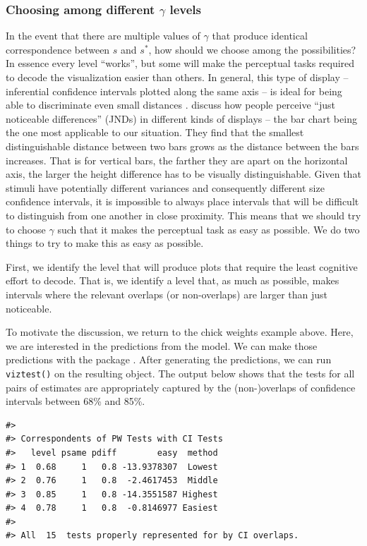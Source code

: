 \subsubsection{\texorpdfstring{Choosing among different \(\gamma\) levels}{Choosing among different \textbackslash gamma levels}}\label{choosing-among-different-gamma-levels}

In the event that there are multiple values of \(\gamma\) that produce identical correspondence between \(s\) and \(s^{*}\), how should we choose among the possibilities? In essence every level ``works'', but some will make the perceptual tasks required to decode the visualization easier than others. In general, this type of display -- inferential confidence intervals plotted along the same axis -- is ideal for being able to discriminate even small distances \citep{cleveland84}. \citet{Lu2022} discuss how people perceive ``just noticeable differences'' (JNDs) in different kinds of displays -- the bar chart being the one most applicable to our situation. They find that the smallest distinguishable distance between two bars grows as the distance between the bars increases. That is for vertical bars, the farther they are apart on the horizontal axis, the larger the height difference has to be visually distinguishable. Given that stimuli have potentially different variances and consequently different size confidence intervals, it is impossible to always place intervals that will be difficult to distinguish from one another in close proximity. This means that we should try to choose \(\gamma\) such that it makes the perceptual task as easy as possible. We do two things to try to make this as easy as possible.

First, we identify the level that will produce plots that require the least cognitive effort to decode. That is, we identify a level that, as much as possible, makes intervals where the relevant overlaps (or non-overlaps) are larger than just noticeable.

To motivate the discussion, we return to the chick weights example above. Here, we are interested in the predictions from the model. We can make those predictions with the  package \citep{marginaleffects}. After generating the predictions, we can run \texttt{viztest()} on the resulting object. The output below shows that the tests for all pairs of estimates are appropriately captured by the (non-)overlaps of confidence intervals between 68\% and 85\%.

\begin{verbatim}
#> 
#> Correspondents of PW Tests with CI Tests
#>   level psame pdiff        easy  method
#> 1  0.68     1   0.8 -13.9378307  Lowest
#> 2  0.76     1   0.8  -2.4617453  Middle
#> 3  0.85     1   0.8 -14.3551587 Highest
#> 4  0.78     1   0.8  -0.8146977 Easiest
#> 
#> All  15  tests properly represented for by CI overlaps.
\end{verbatim}

